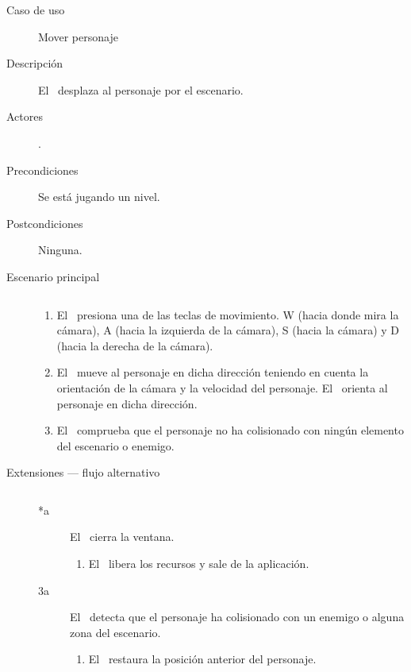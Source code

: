 \begin{description}
    \item [Caso de uso] Mover personaje
    \item [Descripción] El \jugador\ desplaza al personaje por el escenario.
    \item [Actores] \jugador.
    \item [Precondiciones] Se está jugando un nivel.
    \item [Postcondiciones] Ninguna.
    \item [Escenario principal] $\quad$
        \begin{enumerate}
            \item El \jugador\ presiona una de las teclas de movimiento.
            W (hacia donde mira la cámara), A (hacia la izquierda de la cámara),
            S (hacia la cámara) y D (hacia la derecha de la cámara).
            \item El \sistema\ mueve al personaje en dicha dirección
            teniendo en cuenta la orientación de la cámara y la velocidad
            del personaje. El \sistema\ orienta al personaje en dicha dirección.
            \item El \sistema\ comprueba que el personaje no ha colisionado
            con ningún elemento del escenario o enemigo.
        \end{enumerate}
    \item[Extensiones --- flujo alternativo] $\quad$
        \begin{description}
            \item [*a] El \jugador\ cierra la ventana.
                \begin{enumerate}
                    \item El \sistema\ libera los recursos y sale de la aplicación.
                \end{enumerate}
            \item [3a] El \sistema\ detecta que el personaje ha colisionado
            con un enemigo o alguna zona del escenario.
                \begin{enumerate}
                    \item El \sistema\ restaura la posición anterior del personaje.\\
                \end{enumerate}
        \end{description}
    
\end{description}


